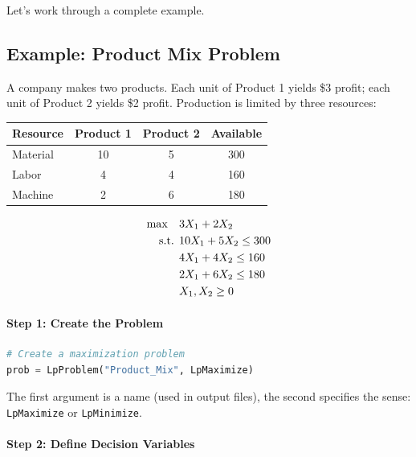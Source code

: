 Let's work through a complete example.

\subsection{Example: Product Mix Problem}
\label{sec:pulp-product-mix}

A company makes two products. Each unit of Product 1 yields \$3 profit; each unit of Product 2 yields \$2 profit. Production is limited by three resources:

\begin{center}
\begin{tabular}{lccc}
\toprule
Resource & Product 1 & Product 2 & Available \\
\midrule
Material & 10 & 5 & 300 \\
Labor & 4 & 4 & 160 \\
Machine & 2 & 6 & 180 \\
\bottomrule
\end{tabular}
\par{}\label{tab:software-python-book1-tab01}%

\end{center}

\begin{align*}
\max \quad & 3X_1 + 2X_2 \\
\mbox{ s.t. }        & 10X_1 + 5X_2 \leq 300 \\
& 4X_1 + 4X_2 \leq 160 \\
& 2X_1 + 6X_2 \leq 180 \\
& X_1, X_2 \geq 0
\end{align*}

\paragraph{Step 1: Create the Problem}

\begin{lstlisting}[language=Python]
# Create a maximization problem
prob = LpProblem("Product_Mix", LpMaximize)
\end{lstlisting}

The first argument is a name (used in output files), the second specifies the sense: \texttt{LpMaximize} or \texttt{LpMinimize}.

\paragraph{Step 2: Define Decision Variables}

